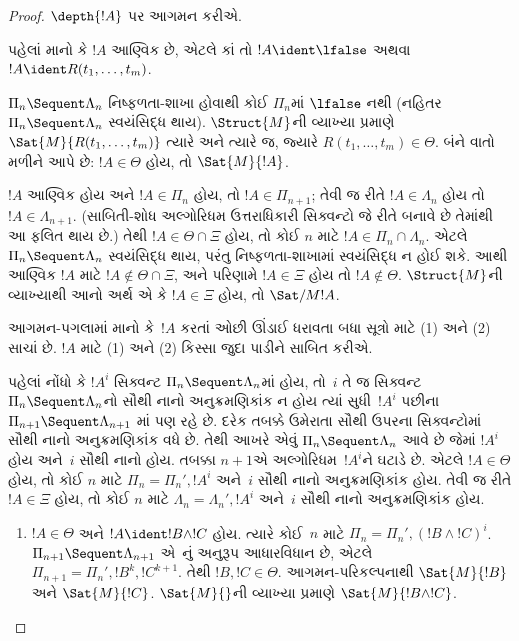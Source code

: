 \begin{proof}
  $\depth{!A}$
  પર આગમન
  કરીએ.

પહેલાં માનો કે
$!A$ આણ્વિક છે,
એટલે કાં તો
$!A \ident \lfalse$
અથવા
$!A
\ident R(t_1, \dots, t_m)$.

$\Pi_n \Sequent \Lambda_n$
નિષ્ફળતા-શાખા
હોવાથી કોઈ
$\Pi_n$માં
$\lfalse$ નથી
(નહિતર
$\Pi_n \Sequent \Lambda_n$
સ્વયંસિદ્ધ
થાય).
$\Struct{M}$ની
વ્યાખ્યા પ્રમાણે
$\Sat{M}{R(t_1, \dots, t_m)}$
ત્યારે અને
ત્યારે જ,
જ્યારે
$R(t_1, \dots, t_m) \in
\Theta$.
બંને વાતો
મળીને આપે છે:
$!A \in
\Theta$ હોય,
તો
$\Sat{M}{!A}$.

$!A$ આણ્વિક
હોય અને
$!A \in \Pi_n$
હોય, તો
$!A \in \Pi_{n+1}$;
તેવી જ રીતે
$!A \in \Lambda_n$
હોય તો
$!A \in \Lambda_{n+1}$.
(સાબિતી-શોધ
અલ્ગોરિધમ
ઉત્તરાધિકારી
સિક્વન્ટો જે
રીતે બનાવે
છે તેમાંથી
આ ફલિત થાય
છે.) તેથી
$!A \in \Theta \cap \Xi$
હોય, તો કોઈ
$n$ માટે
$!A \in \Pi_n \cap
\Lambda_n$.
એટલે
$\Pi_n \Sequent \Lambda_n$
સ્વયંસિદ્ધ
થાય, પરંતુ
નિષ્ફળતા-શાખામાં
સ્વયંસિદ્ધ ન
હોઈ શકે.
આથી આણ્વિક
$!A$ માટે
$!A \notin \Theta
\cap \Xi$,
અને પરિણામે
$!A \in \Xi$
હોય તો
$!A \notin \Theta$.
$\Struct{M}$ની
વ્યાખ્યાથી
આનો અર્થ
એ કે
$!A \in \Xi$
હોય, તો
$\Sat/{M}{!A}$.

આગમન-પગલામાં
માનો કે~$!A$
કરતાં ઓછી
ઊંડાઈ ધરાવતા
બધા સૂત્રો
માટે (1)
અને (2)
સાચાં છે.
$!A$ માટે
(1) અને
(2) કિસ્સા
જુદા પાડીને
સાબિત કરીએ.

પહેલાં નોંધો કે
$!A^i$
સિક્વન્ટ
$\Pi_n \Sequent \Lambda_n$માં
હોય, તો~$i$
તે જ
સિક્વન્ટ~$\Pi_n \Sequent \Lambda_n$નો
સૌથી
નાનો અનુક્રમણિકાંક
ન હોય ત્યાં
સુધી~$!A^i$
પછીના
$\Pi_{n+1} \Sequent \Lambda_{n+1}$
માં પણ રહે
છે. દરેક તબક્કે
ઉમેરાતા સૌથી
ઉપરના સિક્વન્ટોમાં
સૌથી નાનો
અનુક્રમણિકાંક
વધે છે.
તેથી આખરે
એવું
$\Pi_n \Sequent \Lambda_n$
આવે છે જેમાં
$!A^i$ હોય
અને~$i$
સૌથી નાનો
હોય. તબક્કા
$n+1$એ
અલ્ગોરિધમ~$!A^i$ને
ઘટાડે છે.
એટલે
$!A \in \Theta$
હોય, તો કોઈ
$n$ માટે
$\Pi_n = \Pi_n',
!A^i$
અને~$i$
સૌથી નાનો
અનુક્રમણિકાંક
હોય. તેવી જ
રીતે
$!A \in \Xi$
હોય, તો કોઈ
$n$ માટે
$\Lambda_n = \Lambda_n', !A^i$
અને~$i$
સૌથી નાનો
અનુક્રમણિકાંક
હોય.

\begin{enumerate}
  \item $!A \in \Theta$
  અને
  $!A \ident !B \land !C$
  હોય. ત્યારે
  કોઈ~$n$ માટે
  $\Pi_n = \Pi_n', (!B \land !C)^i$.
  $\Pi_{n+1} \Sequent
  \Lambda_{n+1}$
  એ~\LeftR{\land}નું
  અનુરૂપ
  આધારવિધાન
  છે, એટલે
  $\Pi_{n+1} = \Pi_n', !B^k, !C^{k+1}$.
  તેથી
  $!B, !C \in
  \Theta$.
  આગમન-પરિકલ્પનાથી
  $\Sat{M}{!B}$
  અને
  $\Sat{M}{!C}$.
  $\Sat{M}{}$ની
  વ્યાખ્યા પ્રમાણે
  $\Sat{M}{!B \land !C}$.


\end{enumerate}
\end{proof}
